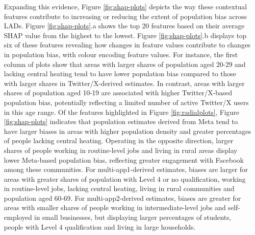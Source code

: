 \documentclass{article}
\begin{document}
Expanding this evidence, Figure \ref{fig:shap-plots} depicts the way
these contextual features contribute to increasing or reducing the
extent of population bias across LADs. Figure \ref{fig:shap-plots}.a
shows the top 20 features based on their average SHAP value from the
highest to the lowest. Figure \ref{fig:shap-plots}.b displays top six of
these features revealing how changes in feature values contribute to
changes in population bias, with colour encoding feature values. For
instance, the first column of plots show that areas with larger shares
of population aged 20-29 and lacking central heating tend to have lower
population bias compared to those with larger shares in
Twitter/X-derived estimates. In contrast, areas with larger shares of
population aged 10-19 are associated with higher Twitter/X-based
population bias, potentially reflecting a limited number of active
Twitter/X users in this age range. Of the features highlighted in Figure
\ref{fig:radialplots}, Figure \ref{fig:shap-plots} indicates that
population estimates derived from Meta tend to have larger biases in
areas with higher population density and greater percentages of people
lacking central heating. Operating in the opposite direction, larger
shares of people working in routine-level jobs and living in rural areas
display lower Meta-based population bias, reflecting greater engagement
with Facebook among these communities. For multi-app1-derived estimates,
biases are larger for areas with greater shares of population with Level
4 or no qualification, working in routine-level jobs, lacking central
heating, living in rural communities and population aged 60-69. For
multi-app2-derived estimates, biases are greater for areas with smaller
shares of people working in intermediate-level jobs and self-employed in
small businesses, but displaying larger percentages of students, people
with Level 4 qualification and living in large households.
\end{document}
